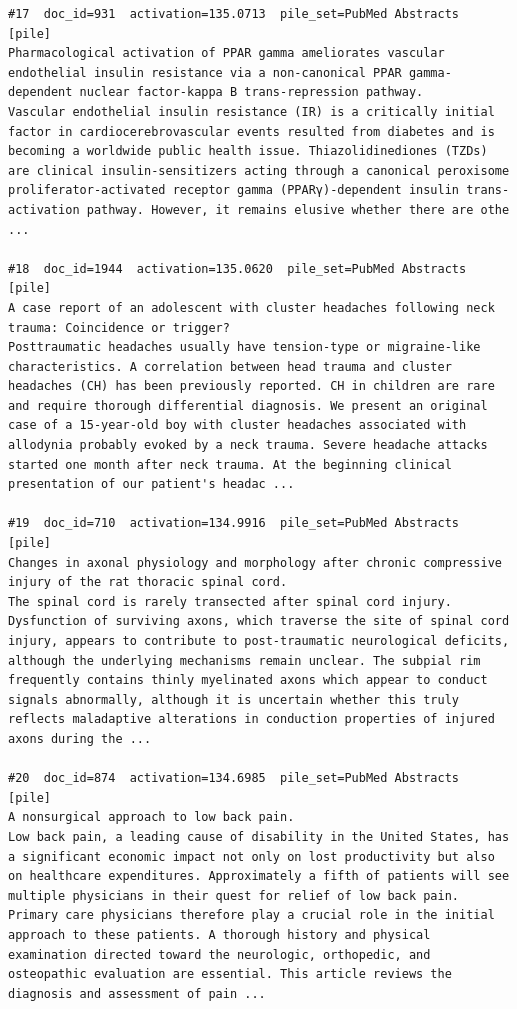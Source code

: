 \begin{verbatim}
#17  doc_id=931  activation=135.0713  pile_set=PubMed Abstracts  [pile]
Pharmacological activation of PPAR gamma ameliorates vascular endothelial insulin resistance via a non-canonical PPAR gamma-dependent nuclear factor-kappa B trans-repression pathway.
Vascular endothelial insulin resistance (IR) is a critically initial factor in cardiocerebrovascular events resulted from diabetes and is becoming a worldwide public health issue. Thiazolidinediones (TZDs) are clinical insulin-sensitizers acting through a canonical peroxisome proliferator-activated receptor gamma (PPARγ)-dependent insulin trans-activation pathway. However, it remains elusive whether there are othe ...

#18  doc_id=1944  activation=135.0620  pile_set=PubMed Abstracts  [pile]
A case report of an adolescent with cluster headaches following neck trauma: Coincidence or trigger?
Posttraumatic headaches usually have tension-type or migraine-like characteristics. A correlation between head trauma and cluster headaches (CH) has been previously reported. CH in children are rare and require thorough differential diagnosis. We present an original case of a 15-year-old boy with cluster headaches associated with allodynia probably evoked by a neck trauma. Severe headache attacks started one month after neck trauma. At the beginning clinical presentation of our patient's headac ...

#19  doc_id=710  activation=134.9916  pile_set=PubMed Abstracts  [pile]
Changes in axonal physiology and morphology after chronic compressive injury of the rat thoracic spinal cord.
The spinal cord is rarely transected after spinal cord injury. Dysfunction of surviving axons, which traverse the site of spinal cord injury, appears to contribute to post-traumatic neurological deficits, although the underlying mechanisms remain unclear. The subpial rim frequently contains thinly myelinated axons which appear to conduct signals abnormally, although it is uncertain whether this truly reflects maladaptive alterations in conduction properties of injured axons during the ...

#20  doc_id=874  activation=134.6985  pile_set=PubMed Abstracts  [pile]
A nonsurgical approach to low back pain.
Low back pain, a leading cause of disability in the United States, has a significant economic impact not only on lost productivity but also on healthcare expenditures. Approximately a fifth of patients will see multiple physicians in their quest for relief of low back pain. Primary care physicians therefore play a crucial role in the initial approach to these patients. A thorough history and physical examination directed toward the neurologic, orthopedic, and osteopathic evaluation are essential. This article reviews the diagnosis and assessment of pain ...

\end{verbatim}

